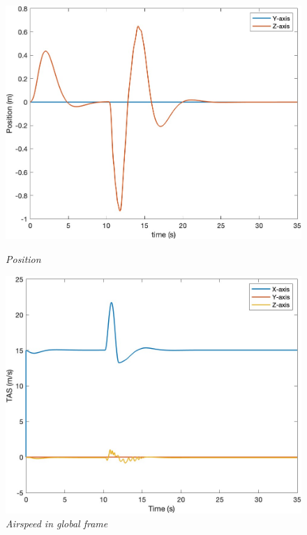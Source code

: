 \begin{figure}[htbp]
  \centering
  \begin{minipage}[b]{0.45\textwidth}
    \centering
    \includegraphics[width=\textwidth]{Images/Gust/Gust FWD pulse 0428/1 position_1.jpg}
    \caption*{\textit{Position}}
  \end{minipage}
  \hfil
  \begin{minipage}[b]{0.45\textwidth}
    \centering
    \includegraphics[width=\textwidth]{Images/Gust/Gust FWD pulse 0428/2 TAS_1.jpg}
    \caption*{\textit{Airspeed in global frame}}
  \end{minipage}

\end{figure}
